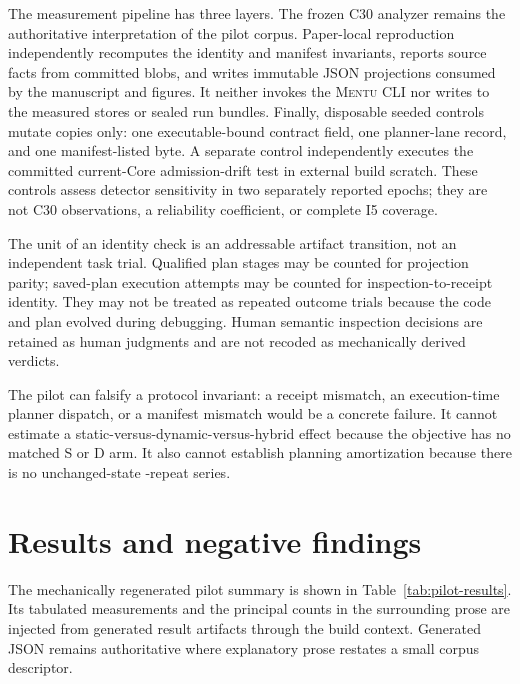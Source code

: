 \documentclass[11pt]{article}
\newcommand{\mentu}{\textsc{Mentu}}
\begin{document}
The measurement pipeline has three layers. The frozen C30 analyzer remains the
authoritative interpretation of the pilot corpus.  Paper-local reproduction
independently recomputes the identity and manifest invariants, reports source
facts from committed blobs, and writes immutable JSON projections consumed by
the manuscript and figures.  It neither invokes the \mentu{} CLI nor writes to
the measured stores or sealed run bundles. Finally, disposable seeded controls
mutate copies only: one executable-bound contract field, one planner-lane
record, and one manifest-listed byte. A separate control independently executes
the committed current-Core admission-drift test in external build scratch.
These controls assess detector sensitivity in two separately reported epochs;
they are not
C30 observations, a reliability coefficient, or complete I5 coverage.

The unit of an identity check is an addressable artifact transition, not an
independent task trial.  Qualified plan stages may be counted for projection
parity; saved-plan execution attempts may be counted for inspection-to-receipt
identity.  They may not be treated as repeated outcome trials because the code
and plan evolved during debugging.  Human semantic inspection decisions are
retained as human judgments and are not recoded as mechanically derived
verdicts.

The pilot can falsify a protocol invariant: a receipt mismatch, an
execution-time planner dispatch, or a manifest mismatch would be a concrete
failure.  It cannot estimate a static-versus-dynamic-versus-hybrid effect
because the objective has no matched S or D arm.  It also cannot establish
planning amortization because there is no unchanged-state
\RegisteredRepeatCount{}-repeat series.

\section{Results and negative findings}

The mechanically regenerated pilot summary is shown in
Table~\ref{tab:pilot-results}. Its tabulated measurements and the principal
counts in the surrounding prose are injected from generated result artifacts
through the build context. Generated JSON remains authoritative where
explanatory prose restates a small corpus descriptor.
\end{document}
